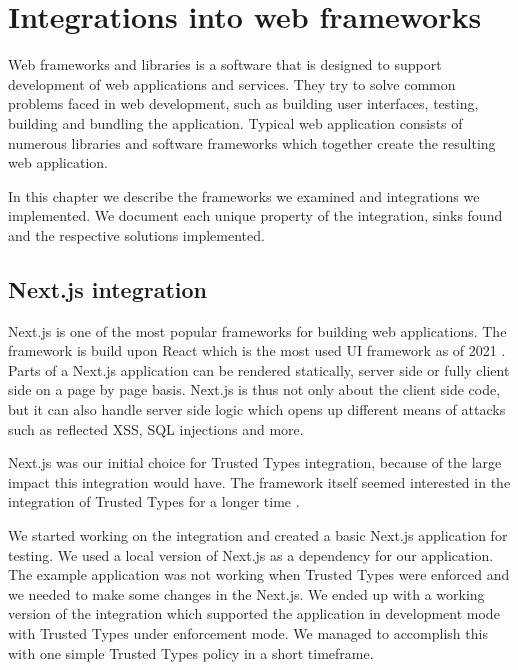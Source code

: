 \chapter{Integrations into web frameworks}

Web frameworks and libraries is a software that is designed to support development of web
applications and services. They try to solve common problems faced in web development, such as
building user interfaces, testing, building and bundling the application. Typical web application
consists of numerous libraries and software frameworks which together create the resulting web
application.

In this chapter we describe the frameworks we examined and integrations we implemented. We document
each unique property of the integration, sinks found and the respective solutions implemented.

\section{Next.js integration}
\label{intro-nextjs}

Next.js is one of the most popular frameworks for building web applications. The framework is build
upon React which is the most used UI framework as of 2021 \cite{react_most_used_2021}. Parts of a
Next.js application can be rendered statically, server side or fully client side on a page by page
basis. Next.js is thus not only about the client side code, but it can also handle server side logic
which opens up different means of attacks such as reflected XSS, SQL injections and more.

Next.js was our initial choice for Trusted Types integration, because of the large impact this
integration would have. The framework itself seemed interested in the integration of Trusted Types
for a longer time \cite{nextjs_tt_pr_2020}.

We started working on the integration and created a basic Next.js application for testing. We used a
local version of Next.js as a dependency for our application. The example application was not
working when Trusted Types were enforced and we needed to make some changes in the Next.js. We ended
up with a working version of the integration which supported the application in development mode
with Trusted Types under enforcement mode. We managed to accomplish this with one simple Trusted
Types policy in a short timeframe.

